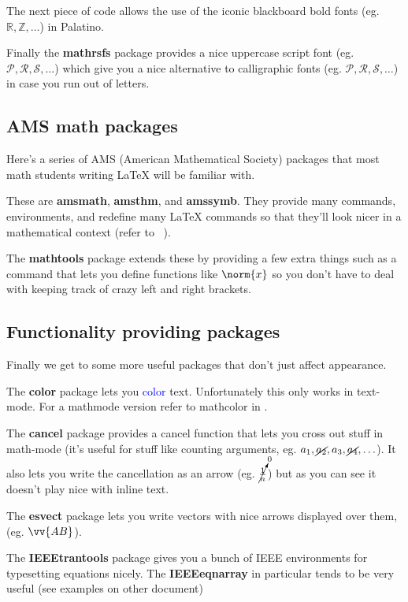       The next piece of code allows the use of the iconic blackboard bold fonts (eg. $\mathbb{R},\mathbb{Z},\ldots$) in Palatino.

      Finally the \textbf{mathrsfs} package provides a nice uppercase script font (eg. $\mathscr{P},\mathscr{R},\mathscr{S},\ldots$) which give you a nice alternative to calligraphic fonts (eg. $\mathcal{P},\mathcal{R},\mathcal{S},\ldots$) in case you run out of letters.
    
    \subsection{AMS math packages}
      Here's a series of AMS (American Mathematical Society) packages that most math students writing \LaTeX{} will be familiar with.

      These are \textbf{amsmath}, \textbf{amsthm}, and \textbf{amssymb}. They provide many commands, environments, and redefine many \LaTeX{} commands so that they'll look nicer in a mathematical context (refer to ~\cite{equations}).

      The \textbf{mathtools} package extends these by providing a few extra things such as a command that lets you define functions like $\norm{x}$ so you don't have to deal with keeping track of crazy left and right brackets.

    \subsection{Functionality providing packages}
      Finally we get to some more useful packages that don't just affect appearance.

      The \textbf{color} package lets you \textcolor{blue}{color} text. Unfortunately this only works in text-mode. For a mathmode version refer to mathcolor in .

      The \textbf{cancel} package provides a cancel function that lets you cross out stuff in math-mode (it's useful for stuff like counting arguments, eg. $a_1,\cancel{a_2},a_3,\cancel{a_4},\ldots$). It also lets you write the cancellation as an arrow (eg. $\cancelto{0}{\frac{1}{n}}$) but as you can see it doesn't play nice with inline text.
      
      The \textbf{esvect} package lets you write vectors with nice arrows displayed over them, (eg. $\vv{AB}$).

      The \textbf{IEEEtrantools} package gives you a bunch of IEEE environments for typesetting equations nicely. The \textbf{IEEEeqnarray} in particular tends to be very useful (see examples on other document)

